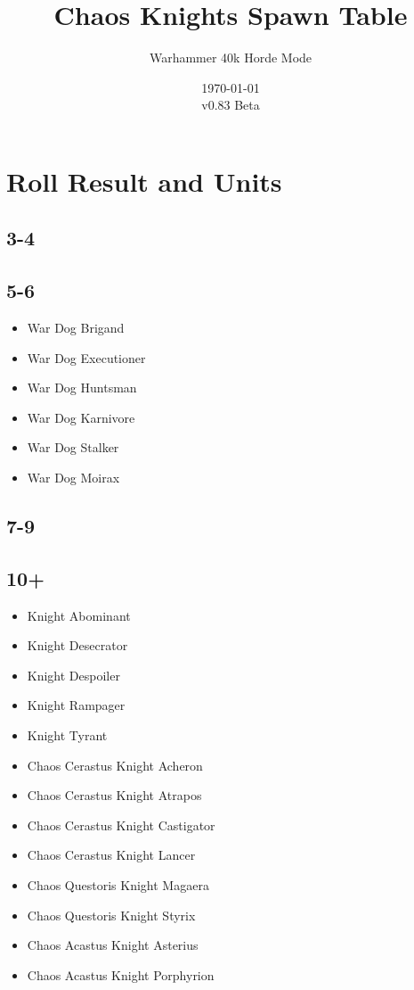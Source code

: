 \documentclass{HordeModeTarot}
\title{Chaos Knights Spawn Table}
\author{Warhammer 40k Horde Mode}
\date{\today \\v0.83 Beta}
\begin{document}
\maketitle

\outputUsingSpawnTableBoilerplate
\section{Roll Result and Units}\hypertarget{roll-results}{}\label{roll-results}

\begin{multicols}{2}

\subsection*{3-4}

\subsection*{5-6}

\begin{itemize}[leftmargin=*]
\item[] War Dog Brigand
\item[] War Dog Executioner
\item[] War Dog Huntsman
\item[] War Dog Karnivore
\item[] War Dog Stalker
\item[] War Dog Moirax
\end{itemize}

\subsection*{7-9}

\subsection*{10+}

\begin{itemize}[leftmargin=*]
\item[] Knight Abominant
\item[] Knight Desecrator
\item[] Knight Despoiler
\item[] Knight Rampager
\item[] Knight Tyrant
\item[] Chaos Cerastus Knight Acheron
\item[] Chaos Cerastus Knight Atrapos
\item[] Chaos Cerastus Knight Castigator
\item[] Chaos Cerastus Knight Lancer
\item[] Chaos Questoris Knight Magaera
\item[] Chaos Questoris Knight Styrix
\item[] Chaos Acastus Knight Asterius
\item[] Chaos Acastus Knight Porphyrion
\end{itemize}


\end{multicols}
\end{document}
